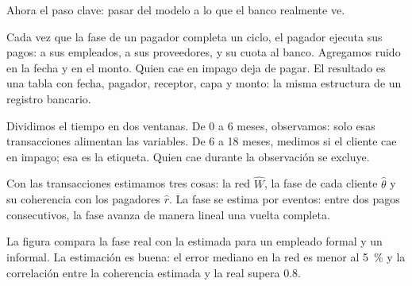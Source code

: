\begin{decir}
Ahora el paso clave: pasar del modelo a lo que el banco realmente ve.

Cada vez que la fase de un pagador completa un ciclo, el pagador ejecuta sus pagos: a
sus empleados, a sus proveedores, y su cuota al banco. Agregamos ruido en la fecha y en el
monto. Quien cae en impago deja de pagar. El resultado es una tabla con fecha, pagador,
receptor, capa y monto: la misma estructura de un registro bancario.

Dividimos el tiempo en dos ventanas. De 0 a 6 meses, observamos: solo esas transacciones
alimentan las variables. De 6 a 18 meses, medimos si el cliente cae en impago; esa es la
etiqueta. Quien cae durante la observación se excluye.

Con las transacciones estimamos tres cosas: la red $\hat W$, la fase de cada cliente
$\hat\theta$ y su coherencia con los pagadores $\hat r$. La fase se estima por eventos:
entre dos pagos consecutivos, la fase avanza de manera lineal una vuelta completa.

La figura compara la fase real con la estimada para un empleado formal y un informal. La
estimación es buena: el error mediano en la red es menor al 5~\% y la correlación entre la
coherencia estimada y la real supera 0.8.
\end{decir}
